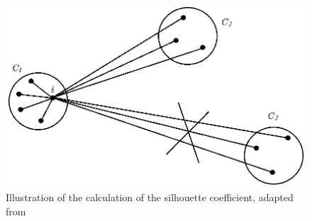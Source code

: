 \begin{figure}[!]
	\centering
	\includegraphics[width=0.9\columnwidth]{images/silhouette.jpg}
	\caption[Silhouette Coefficient]{Illustration of the calculation of the silhouette coefficient, adapted from \cite{silhouette}}
    \label{fig:silhouette}
\end{figure}

